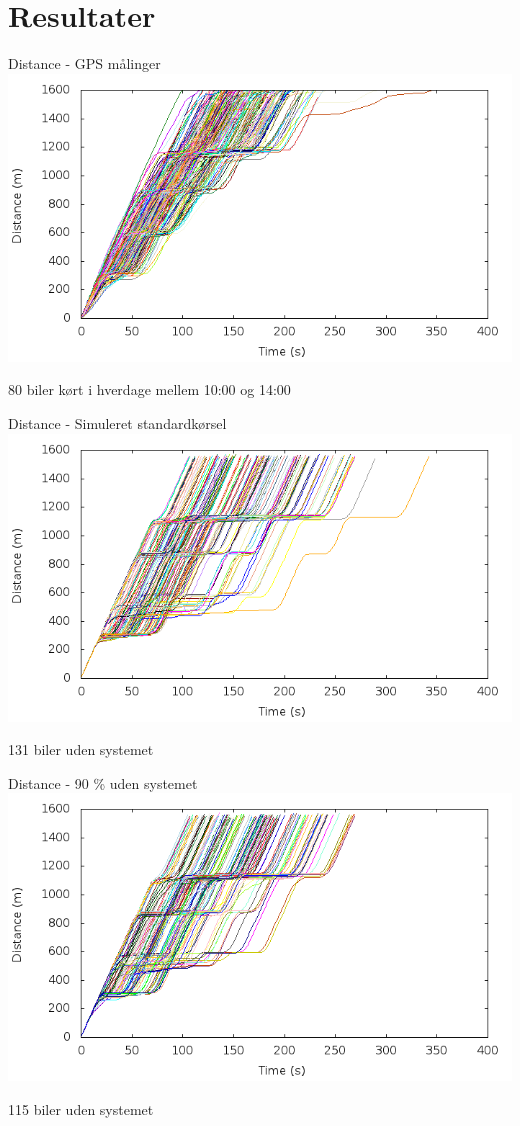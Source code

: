 \section{Resultater}

\begin{frame}{Distance - GPS målinger}
\includegraphics[width=1\textwidth]{../images/Real/RealDistance.png}

80 biler kørt i hverdage mellem 10:00 og 14:00
\end{frame}

\begin{frame}{Distance - Simuleret standardkørsel}
\includegraphics[width=1\textwidth]{../images/tp0c1_0/distanceUncontrolled0.png}

131 biler uden systemet
\end{frame}

\begin{frame}{Distance - 90 \% uden systemet}
\includegraphics[width=1\textwidth]{../images/tp0c1_0/distanceUncontrolled10.png}

115 biler uden systemet
\end{frame}

